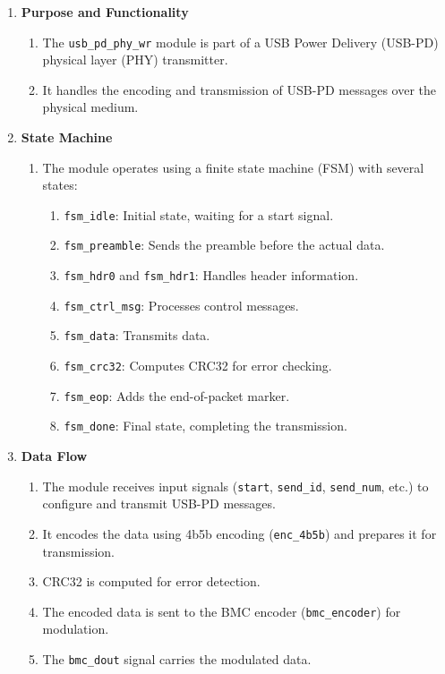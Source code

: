 \begin{enumerate}
    \item \textbf{Purpose and Functionality}
    \begin{enumerate}
        \item The \texttt{usb\_pd\_phy\_wr} module is part of a USB Power Delivery (USB-PD) physical layer (PHY) transmitter.
        \item It handles the encoding and transmission of USB-PD messages over the physical medium.
    \end{enumerate}

    \item \textbf{State Machine}
    \begin{enumerate}
        \item The module operates using a finite state machine (FSM) with several states:
        \begin{enumerate}
            \item \texttt{fsm\_idle}: Initial state, waiting for a start signal.
            \item \texttt{fsm\_preamble}: Sends the preamble before the actual data.
            \item \texttt{fsm\_hdr0} and \texttt{fsm\_hdr1}: Handles header information.
            \item \texttt{fsm\_ctrl\_msg}: Processes control messages.
            \item \texttt{fsm\_data}: Transmits data.
            \item \texttt{fsm\_crc32}: Computes CRC32 for error checking.
            \item \texttt{fsm\_eop}: Adds the end-of-packet marker.
            \item \texttt{fsm\_done}: Final state, completing the transmission.
        \end{enumerate}
    \end{enumerate}

    \item \textbf{Data Flow}
    \begin{enumerate}
        \item The module receives input signals (\texttt{start}, \texttt{send\_id}, \texttt{send\_num}, etc.) to configure and transmit USB-PD messages.
        \item It encodes the data using 4b5b encoding (\texttt{enc\_4b5b}) and prepares it for transmission.
        \item CRC32 is computed for error detection.
        \item The encoded data is sent to the BMC encoder (\texttt{bmc\_encoder}) for modulation.
        \item The \texttt{bmc\_dout} signal carries the modulated data.
    \end{enumerate}


\end{enumerate}
